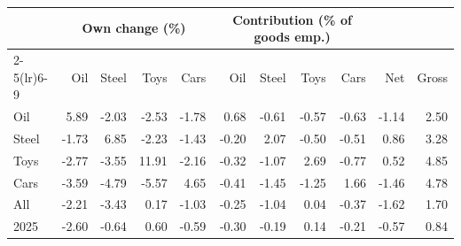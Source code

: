 \begin{tabular}{lrrrrrrrrrr}
\toprule
 & \multicolumn{4}{c}{Own change (\%)} & \multicolumn{4}{c}{Contribution (\% of goods emp.)} & & \\
\cmidrule(lr){2-5}\cmidrule(lr){6-9}
 & Oil & Steel & Toys & Cars & Oil & Steel & Toys & Cars & Net & Gross \\
\midrule
Oil & 5.89 & -2.03 & -2.53 & -1.78 & 0.68 & -0.61 & -0.57 & -0.63 & -1.14 & 2.50 \\
Steel & -1.73 & 6.85 & -2.23 & -1.43 & -0.20 & 2.07 & -0.50 & -0.51 & 0.86 & 3.28 \\
Toys & -2.77 & -3.55 & 11.91 & -2.16 & -0.32 & -1.07 & 2.69 & -0.77 & 0.52 & 4.85 \\
Cars & -3.59 & -4.79 & -5.57 & 4.65 & -0.41 & -1.45 & -1.25 & 1.66 & -1.46 & 4.78 \\
All & -2.21 & -3.43 & 0.17 & -1.03 & -0.25 & -1.04 & 0.04 & -0.37 & -1.62 & 1.70 \\
2025 & -2.60 & -0.64 & 0.60 & -0.59 & -0.30 & -0.19 & 0.14 & -0.21 & -0.57 & 0.84 \\
\bottomrule
\end{tabular}
